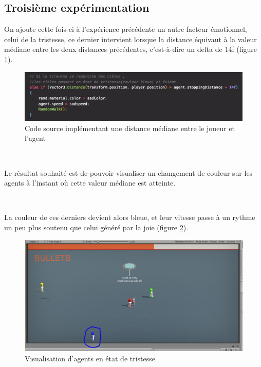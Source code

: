 \subsection{Troisième expérimentation}

On ajoute cette fois-ci à l'expérience précédente un autre facteur émotionnel, celui de la tristesse, ce dernier intervient lorsque la distance équivaut à la valeur médiane entre les deux distances précédentes, c’est-à-dire un delta de 14f (figure \ref{fig:333f}).


\begin{figure}[th]
\centering
\includegraphics{Figures/333f.JPG}
\decoRule
\caption[Code source implémentant une distance médiane]{Code source implémentant une distance médiane entre le joueur et l'agent}
\label{fig:333f}
\end{figure}

~\par
Le résultat souhaité est de pouvoir visualiser un changement de couleur sur les agents à l’instant où cette valeur médiane est atteinte. 


~\par
La couleur de ces derniers devient alors bleue, et leur vitesse passe à un rythme un peu plus soutenu que celui généré par la joie (figure \ref{fig:bichi3}).

\begin{figure}[th]
\centering
\includegraphics{Figures/bleu.JPG}
\decoRule
\caption[Visualisation d'agents en état de tristesse]{Visualisation d'agents en état de tristesse}
\label{fig:bichi3}
\end{figure}


